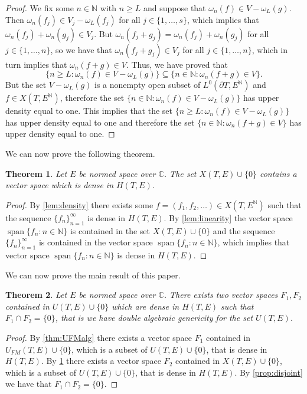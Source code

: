 \documentclass[twoside, 11pt]{article}
\DeclareMathOperator{\Span}{span}
\renewcommand{\geq}{\geqslant}
\newcommand{\C}{\mathbb{C}}
\newcommand{\N}{\mathbb{N}}
\theoremstyle{plain}
\newtheorem{theorem}{Theorem}[section]
\theoremstyle{definition}
\begin{document}
\begin{proof}
We fix some $n \in\N$ with $n \geq L$ and suppose that $\omega_n(f) \in V - \omega_L(g)$.
Then $\omega_n(f_j) \in V_j - \omega_L(f_j)$ for all $j \in \{1,\dots,s\}$, which implies that $\omega_n(f_j)+ \omega_n(g_j) \in V_j$.
But $\omega_n(f_j + g_j) = \omega_n(f_j) + \omega_n(g_j)$ for all $j \in \{1,\dots,n\}$, so we have that $\omega_n(f_j+g_j) \in V_j$ for all $j \in \{1,\dots,n\}$, which in turn implies that $\omega_n(f+g) \in V$.
Thus, we have proved that
$$\{n \geq L: \omega_n(f) \in V - \omega_L(g)\} \subseteq \{n\in\N: \omega_n(f+g) \in V\}.$$
But the set $V - \omega_L(g)$ is a nonempty open subset of $L^0(\partial T, E^\N)$ and $f \in X(T,E^\N)$, therefore the set $\{n \in \N: \omega_n(f) \in V - \omega_L(g)\}$ has upper density equal to one.
This implies that the set $\{n \geq L: \omega_n(f) \in V - \omega_L(g)\}$ has upper density equal to one and therefore the set $\{n\in\N: \omega_n(f+g) \in V\}$ has upper density equal to one.
\end{proof}

We can now prove the following theorem.

\begin{theorem}
\label{thm:Xalg}
Let $E$ be normed space over $\C$.
The set $X(T,E)\cup\{0\}$ contains a vector space which is dense in $H(T,E)$.
\end{theorem}
\begin{proof}
By \cref{lem:density} there exists some $f = (f_1,f_2, \dots ) \in X(T,E^\N)$ such that the sequence $\{f_n\}_{n=1}^{\infty}$ is dense in $H(T,E)$.
By \cref{lem:linearity} the vector space $\Span\{f_n: n\in \N\}$ is contained in the set $X(T,E) \cup \{0\}$ and the sequence $\{f_n\}_{n=1}^{\infty}$ is contained in the vector space $\Span\{f_n: n\in \N\}$, which implies that vector space $\Span\{f_n: n\in \N\}$ is dense in $H(T,E)$.
\end{proof}

We can now prove the main result of this paper.

\begin{theorem}
Let $E$ be normed space over $\C$.
There exists two vector spaces $F_1,F_2$ contained in $U(T,E)\cup\{0\}$ which are dense in $H(T,E)$ such that $F_1 \cap F_2 = \{0\}$, that is we have double algebraic genericity for the set $U(T,E)$.
\end{theorem}
\begin{proof}
By \cref{thm:UFMalg} there exists a vector space $F_1$ contained in $U_{FM}(T,E)\cup\{0\}$, which is a subset of $U(T,E)\cup\{0\}$, that is dense in $H(T,E)$.
By \cref{thm:Xalg} there exists a vector space $F_2$ contained in $X(T,E)\cup\{0\}$, which is a subset of $U(T,E)\cup\{0\}$, that is dense in $H(T,E)$.
By \cref{prop:disjoint} we have that $F_1 \cap F_2 = \{0\}$.
\end{proof}
\end{document}

